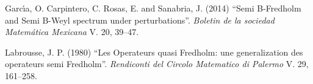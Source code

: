 \begin{titlepage}
\begin{thebibliography}{99}
 {\sc Garc\'{\i}a, O. Carpintero, C. Rosas, E. and Sanabria, J.} (2014) ``Semi B-Fredholm and Semi B-Weyl spectrum under perturbations''. \emph{Boletin de la sociedad Matem\'{a}tica Mexicana} V. 20, 39--47.
    
 {\sc Labrousse, J. P.} (1980) ``Les Operateurs quasi Fredholm: une generalization des operateurs semi Fredholm''. \emph{Rendiconti del Circolo Matematico di Palermo} V. 29, 161--258.
\end{thebibliography}
\end{titlepage}


\begin{titlepage}
\author{%
\\
    Dr. Orlando J. Garcia M.\\
    Universidad de Oriente, Venezuela\\
    \texttt{\footnotesize ogarciam554@gmail.com}\vspace{20pt} \\
         }
 \newcommand{\RE}{\mathrm{Re}}
 \newcommand{\IM}{\mathrm{Im}}
 \newcommand{\eps}{\varepsilon}
 \newcommand{\To}{\longrightarrow}
 \newcommand{\h}{\mathfrak{H}}
\newcommand{\Ho}{\mathcal{H}}
 \newcommand{\s}{\mathcal{S}}
 \newcommand{\A}{\mathrm{A}}
 \newcommand{\conv}{\xymatrix {*+<0.025cm>^[o][F-]{\star}}}
 \newcommand{\K}{\mathcal{K}}
 \newcommand{\J}{\mathcal{J}}
 \newcommand{\V}{\mathcal{V}}
  \newcommand{\B}{\mathcal{B}}
 \newcommand{\M}{\mathcal{M}}
 \newcommand{\E}{\mathbf{E}}
 \newcommand{\W}{\mathcal{W}}
 \newcommand{\I}{\mathcal{I}}
 \newcommand{\N}{\mathbb{N}}
\newcommand{\arctanh}{\textrm{arctanh}}
\newcommand{\arcsinh}{\textrm{arcsinh}}
\newcommand{\arccosh}{\textrm{arccosh}}
\newcommand{\sech}{\textrm{sech}}
 \newcommand{\je}{J_{\ell_{2}}}
 \newcommand{\WIA} {\widetilde{a}}
 \newcommand{\X}{\mathcal{X}}
  \newcommand{\Disk}{\mathbb{D}}
 \newcommand{\BOP}{\mathbf{B}}
 \newcommand{\BBd}{\mathcal{B}\left(\Bergman\left(\Disk\right)\right)}

\end{titlepage}

